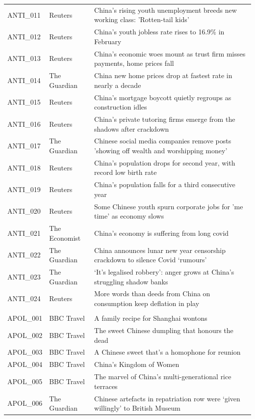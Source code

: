 \begin{longtable}{@{}p{1.5cm}p{2.6cm}p{9.8cm}@{}}
ANTI\_011 & Reuters & China's rising youth unemployment breeds new working class: 'Rotten-tail kids' \\
ANTI\_012 & Reuters & China's youth jobless rate rises to 16.9\% in February \\
ANTI\_013 & Reuters & China's economic woes mount as trust firm misses payments, home prices fall \\
ANTI\_014 & The Guardian & China new home prices drop at fastest rate in nearly a decade \\
ANTI\_015 & Reuters & China's mortgage boycott quietly regroups as construction idles \\
ANTI\_016 & Reuters & China's private tutoring firms emerge from the shadows after crackdown \\
ANTI\_017 & The Guardian & Chinese social media companies remove posts 'showing off wealth and worshipping money' \\
ANTI\_018 & Reuters & China's population drops for second year, with record low birth rate \\
ANTI\_019 & Reuters & China's population falls for a third consecutive year \\
ANTI\_020 & Reuters & Some Chinese youth spurn corporate jobs for 'me time' as economy slows \\
ANTI\_021 & The Economist & China’s economy is suffering from long covid \\
ANTI\_022 & The Guardian & China announces lunar new year censorship crackdown to silence Covid ‘rumours’ \\
ANTI\_023 & The Guardian & ‘It’s legalised robbery’: anger grows at China’s struggling shadow banks \\
ANTI\_024 & Reuters & More words than deeds from China on consumption keep deflation in play \\
\addlinespace
\multicolumn{3}{l}{\textit{Apolitical China}}\\
APOL\_001 & BBC Travel & A family recipe for Shanghai wontons \\
APOL\_002 & BBC Travel & The sweet Chinese dumpling that honours the dead \\
APOL\_003 & BBC Travel & A Chinese sweet that's a homophone for reunion \\
APOL\_004 & BBC Travel & China's Kingdom of Women \\
APOL\_005 & BBC Travel & The marvel of China's multi-generational rice terraces \\
APOL\_006 & The Guardian & Chinese artefacts in repatriation row were ‘given willingly’ to British Museum \\

\end{longtable}

